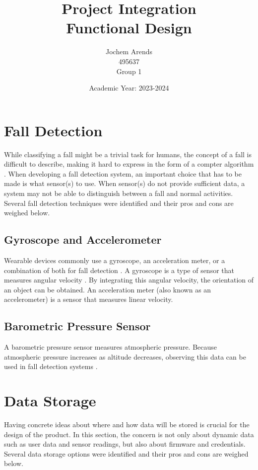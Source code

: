 \documentclass{article}
\title{Project Integration \\ Functional Design}
\author{Jochem Arends \\ 495637 \\ Group 1}
\date{Academic Year: 2023-2024}
\begin{document}
\maketitle
\newpage

\tableofcontents
\clearpage

\section{Fall Detection}

While classifying a fall might be a trivial task for humans, the concept of a fall is difficult to describe, making it hard to express in the form of a compter algorithm \cite{noury-2007}.
When developing a fall detection system, an important choice that has to be made is what sensor(s) to use.
When sensor(s) do not provide sufficient data, a system may not be able to distinguish between a fall and normal activities.
Several fall detection techniques were identified and their pros and cons are weighed below.

\subsection{Gyroscope and Accelerometer}

Wearable devices commonly use a gyroscope, an acceleration meter, or a combination of both for fall detection \cite{delahoz-2014}.
A gyroscope is a type of sensor that measures angular velocity \cite{passaro-2017}.
By integrating this angular velocity, the orientation of an object can be obtained.
An acceleration meter (also known as an accelerometer) is a sensor that measures linear velocity.

\subsection{Barometric Pressure Sensor}

A barometric pressure sensor measures atmospheric pressure.
Because atmospheric pressure increases as altitude decreases, observing this data can be used in fall detection systems \cite{sun-2019}.

\section{Data Storage}

Having concrete ideas about where and how data will be stored is crucial for the design of the product.
In this section, the concern is not only about dynamic data such as user data and sensor readings, but also about firmware and credentials.
Several data storage options were identified and their pros and cons are weighed below.
\end{document}
